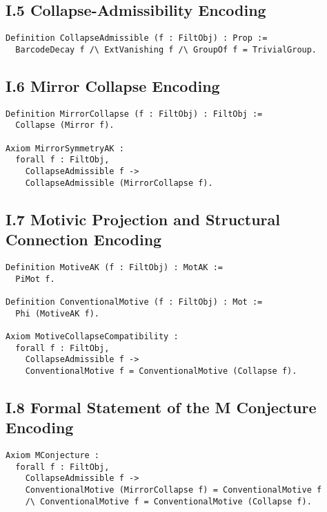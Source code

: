 \documentclass[11pt]{article}
\begin{document}
\subsection*{I.5 Collapse-Admissibility Encoding}

\begin{lstlisting}[language=Coq, caption=Collapse-Admissibility]
Definition CollapseAdmissible (f : FiltObj) : Prop :=
  BarcodeDecay f /\ ExtVanishing f /\ GroupOf f = TrivialGroup.
\end{lstlisting}

\subsection*{I.6 Mirror Collapse Encoding}

\begin{lstlisting}[language=Coq, caption=Mirror Collapse Process]
Definition MirrorCollapse (f : FiltObj) : FiltObj :=
  Collapse (Mirror f).

Axiom MirrorSymmetryAK :
  forall f : FiltObj,
    CollapseAdmissible f ->
    CollapseAdmissible (MirrorCollapse f).
\end{lstlisting}

\subsection*{I.7 Motivic Projection and Structural Connection Encoding}

\begin{lstlisting}[language=Coq, caption=Motivic Connection]
Definition MotiveAK (f : FiltObj) : MotAK :=
  PiMot f.

Definition ConventionalMotive (f : FiltObj) : Mot :=
  Phi (MotiveAK f).

Axiom MotiveCollapseCompatibility :
  forall f : FiltObj,
    CollapseAdmissible f ->
    ConventionalMotive f = ConventionalMotive (Collapse f).
\end{lstlisting}

\subsection*{I.8 Formal Statement of the M Conjecture Encoding}

\begin{lstlisting}[language=Coq, caption=Formal Statement of the M Conjecture]
Axiom MConjecture :
  forall f : FiltObj,
    CollapseAdmissible f ->
    ConventionalMotive (MirrorCollapse f) = ConventionalMotive f
    /\ ConventionalMotive f = ConventionalMotive (Collapse f).
\end{lstlisting}
\end{document}
